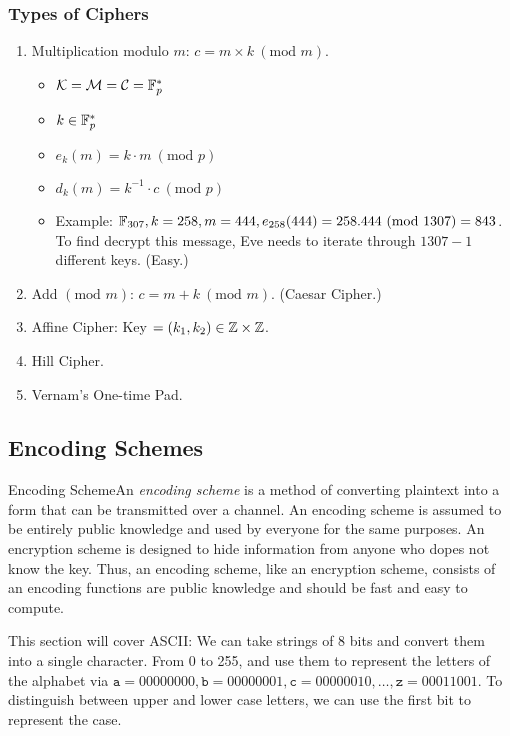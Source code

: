 \begin{center}
    \subsubsection{Types of Ciphers}
\end{center}

\begin{enumerate}[label=\arabic*.]
    \item Multiplication modulo \(m\): \(c = m \times k \ (\text{mod } m)\).
          \begin{itemize}
              \item \(\mathcal{K} = \mathcal{M} = \mathcal{C} = \mathbb{F}_p^*\)
              \item \(k \in \mathbb{F}_p^*\)
              \item \(e_k(m) = k \cdot m \ (\text{mod } p)\)
              \item \(d_k(m) = k^{-1} \cdot c \ (\text{mod } p)\)
              \item Example: \(\mathbb{F}_{307}, k = 258, m = 444, e_{258}(444) = 258.444 \ (\text{mod } 1307) = 843\). To find decrypt this message, Eve needs to iterate through \(1307 - 1\) different keys. (Easy.)
          \end{itemize}
    \item Add \((\text{mod } m)\): \(c = m + k \ (\text{mod } m)\). (Caesar Cipher.)
    \item Affine Cipher: Key \(= (k_1,k_2) \in \mathbb{Z} \times \mathbb{Z}\).
    \item Hill Cipher.
    \item Vernam's One-time Pad.
\end{enumerate}

\subsection{Encoding Schemes}

\begin{definition}
    {Encoding Scheme}An \textit{encoding scheme} is a method of converting plaintext into a form that can be transmitted over a channel. An encoding scheme is assumed to be entirely public knowledge and used by everyone for the same purposes. An encryption scheme is designed to hide information from anyone who dopes not know the key. Thus, an encoding scheme, like an encryption scheme, consists of an encoding functions are public knowledge and should be fast and easy to compute.
\end{definition}

This section will cover ASCII\@: We can take strings of 8 bits and convert them into a single character. From 0 to 255, and use them to represent the letters of the alphabet via \(\texttt{a} = 00000000, \texttt{b} = 00000001, \texttt{c} = 00000010, \dots, \texttt{z} = 00011001\). To distinguish between upper and lower case letters, we can use the first bit to represent the case.